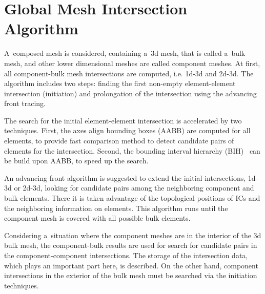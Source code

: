 \section{Global Mesh Intersection Algorithm}
\label{sec:front_advancing}
A~composed mesh is considered, containing a~3d mesh, that is called a~bulk mesh, and
other lower dimensional meshes are called component meshes. 
At first, all component-bulk mesh intersections are computed, i.e. 1d-3d and 2d-3d.
The algorithm includes two steps: finding the first non-empty element-element intersection (initiation)
and prolongation of the intersection using the advancing front tracing.

The search for the initial element-element intersection is accelerated by two techniques.
First, the axes align bounding boxes (AABB) are computed for all elements, to provide fast
comparison method to detect candidate pairs of elements for the intersection.
Second, the bounding interval hierarchy (BIH)~\cite{wachter_instant_2006} can be build upon AABB, to speed up the search.

An advancing front algorithm is suggested to extend the initial intersections, 1d-3d or 2d-3d,
looking for candidate pairs among the neighboring component and bulk elements.
There it is taken advantage of the topological positions of ICs and the neighboring information on elements.
This algorithm runs until the component mesh is covered with all possible bulk elements.

Considering a~situation where the component meshes are in the interior of the 3d bulk mesh,
the component-bulk results are used for search for candidate pairs in the component-component intersections.
The storage of the intersection data, which plays an important part here, is described.
On the other hand, component intersections in the exterior of the bulk mesh must be searched via the initiation
techniques.


